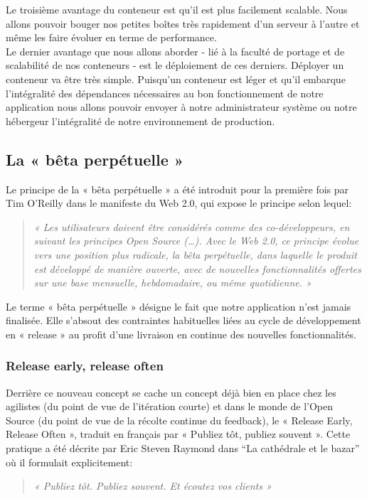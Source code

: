      Le troisième avantage du conteneur est qu’il est plus facilement scalable. Nous allons pouvoir bouger nos petites boîtes très rapidement d’un serveur à l’autre et même les faire évoluer en terme de performance.\\

      Le dernier avantage que nous allons aborder - lié à la faculté de portage et de scalabilité de nos conteneurs - est le déploiement de ces derniers. Déployer un conteneur va être très simple. Puisqu’un conteneur est léger et qu’il embarque l’intégralité des dépendances nécessaires au bon fonctionnement de notre application nous allons pouvoir envoyer à notre administrateur système ou notre hébergeur l’intégralité de notre environnement de production.

    \subsection{La « bêta perpétuelle »}
    Le principe de la « bêta perpétuelle » a été introduit pour la première fois par Tim O’Reilly dans le manifeste du Web 2.0, qui expose le principe selon lequel:\\
    \begin{quotation}
      \emph{« Les utilisateurs doivent être considérés comme des co-développeurs, en suivant les principes Open Source (…). Avec le Web 2.0, ce principe évolue vers une position plus radicale, la bêta perpétuelle, dans laquelle le produit est développé de manière ouverte, avec de nouvelles fonctionnalités offertes sur une base mensuelle, hebdomadaire, ou même quotidienne. »}\\
    \end{quotation}

    Le terme « bêta perpétuelle » désigne le fait que notre application n’est jamais finalisée. Elle s’absout des contraintes habituelles liées au cycle de développement en « release » au profit d’une livraison en continue des nouvelles fonctionnalités.

      \subsubsection{Release early, release often}
      Derrière ce nouveau concept se cache un concept déjà bien en place chez les agilistes (du point de vue de l’itération courte) et dans le monde de l’Open Source (du point de vue de la récolte continue du feedback), le « Release Early, Release Often », traduit en français par « Publiez tôt, publiez souvent ». Cette pratique a été décrite par Eric Steven Raymond dans “La cathédrale et le bazar” où il formulait explicitement:\\
      \begin{quotation}
        \emph{« Publiez tôt. Publiez souvent. Et écoutez vos clients »}\\
      \end{quotation}

